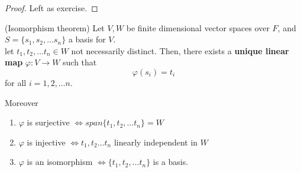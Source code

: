 \begin{proof}
    Left as exercise.
\end{proof}

\begin{theorem}
    (Isomorphism theorem) Let $V, W$ be finite dimensional vector spaces over $F$, and $S = \{ s_1, s_2, \hdots s_n \} $ a basis for $V$. \\

    let $t_1, t_2, \hdots t_n \in W$ not necessarily distinct. Then, there exists a \textbf{unique linear map} $\varphi: V \to W$ such that 
    \[
        \varphi(s_i) = t_i
    \]
    for all $i = 1, 2, \hdots n$. 

    Moreover
    \begin{enumerate}
        \item $\varphi$ is surjective $\iff span \{t_1, t_2, \hdots t_n \} = W$  
        \item $\varphi$ is injective  $\iff t_1, t_2 \hdots t_n $ linearly independent in $W$ 
        \item $\varphi$ is an isomorphism $\iff \{ t_1, t_2, \hdots t_n \} $ is a basis. 
    \end{enumerate}
\end{theorem}


